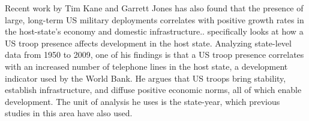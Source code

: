 \documentclass[12pt]{article}
\begin{document}
\begin{doublespace}
Recent work by Tim Kane and Garrett Jones has also found that the presence of large, long-term US military deployments correlates with positive growth rates in the host-state's economy and domestic infrastructure.\cite{kane2012development,jones2012us}.  
specifically looks at how a US troop presence affects development in the host state. Analyzing state-level data from 1950 to 2009, one of his findings is that a US troop presence correlates with an increased number of telephone lines in the host state, a development indicator used by the World Bank. He argues that US troops bring stability, establish infrastructure, and diffuse positive economic norms, all of which enable development. The unit of analysis he uses is the state-year, which previous studies in this area have also used.



\end{doublespace}
\end{document}
